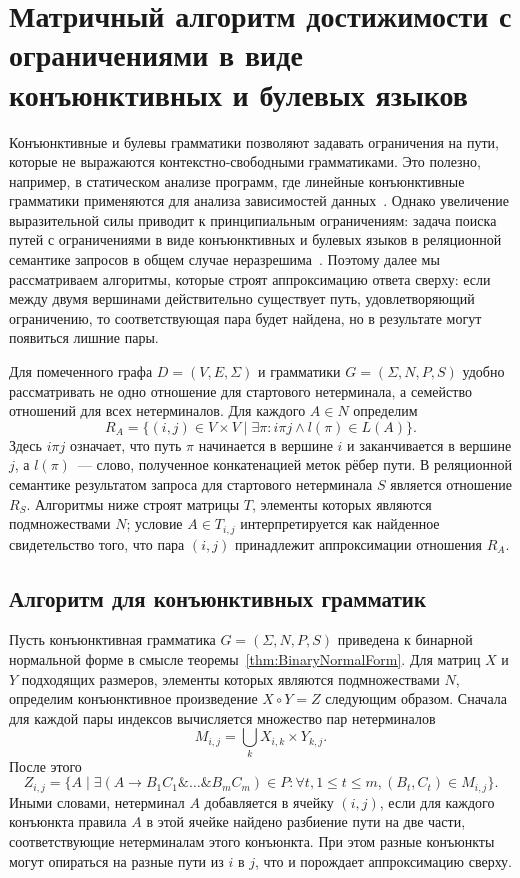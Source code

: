 \section{Матричный алгоритм достижимости с ограничениями в виде конъюнктивных и булевых языков}
	\label{sec:ConjunctiveBooleanReachability}

Конъюнктивные и булевы грамматики позволяют задавать ограничения на пути, которые не выражаются контекстно-свободными грамматиками. Это полезно, например, в статическом анализе программ, где линейные конъюнктивные грамматики применяются для анализа зависимостей данных~. Однако увеличение выразительной силы приводит к принципиальным ограничениям: задача поиска путей с ограничениями в виде конъюнктивных и булевых языков в реляционной семантике запросов в общем случае неразрешима~. Поэтому далее мы рассматриваем алгоритмы, которые строят аппроксимацию ответа сверху: если между двумя вершинами действительно существует путь, удовлетворяющий ограничению, то соответствующая пара будет найдена, но в результате могут появиться лишние пары.

Для помеченного графа $D = (V,E,\Sigma)$ и грамматики $G = (\Sigma,N,P,S)$ удобно рассматривать не одно отношение для стартового нетерминала, а семейство отношений для всех нетерминалов. Для каждого $A \in N$ определим
\[
    R_A = \{(i,j) \in V \times V \mid \exists \pi: i \pi j \land l(\pi) \in L(A)\}.
\]
Здесь $i \pi j$ означает, что путь $\pi$ начинается в вершине $i$ и заканчивается в вершине $j$, а $l(\pi)$~--- слово, полученное конкатенацией меток рёбер пути. В реляционной семантике результатом запроса для стартового нетерминала $S$ является отношение $R_S$. Алгоритмы ниже строят матрицы $T$, элементы которых являются подмножествами $N$; условие $A \in T_{i,j}$ интерпретируется как найденное свидетельство того, что пара $(i,j)$ принадлежит аппроксимации отношения $R_A$.

\subsection{Алгоритм для конъюнктивных грамматик}
	\label{subsec:ConjunctiveReachabilityAlgorithm}

Пусть конъюнктивная грамматика $G = (\Sigma,N,P,S)$ приведена к бинарной нормальной форме в смысле теоремы~\ref{thm:BinaryNormalForm}. Для матриц $X$ и $Y$ подходящих размеров, элементы которых являются подмножествами $N$, определим конъюнктивное произведение $X \circ Y = Z$ следующим образом. Сначала для каждой пары индексов вычисляется множество пар нетерминалов
\[
    M_{i,j} = \bigcup_k X_{i,k} \times Y_{k,j}.
\]
После этого
\[
    Z_{i,j} = \{A \mid \exists (A \rightarrow B_1 C_1 \& \ldots \& B_m C_m) \in P: \forall t, 1 \leq t \leq m, (B_t,C_t) \in M_{i,j}\}.
\]
Иными словами, нетерминал $A$ добавляется в ячейку $(i,j)$, если для каждого конъюнкта правила $A$ в этой ячейке найдено разбиение пути на две части, соответствующие нетерминалам этого конъюнкта. При этом разные конъюнкты могут опираться на разные пути из $i$ в $j$, что и порождает аппроксимацию сверху.


